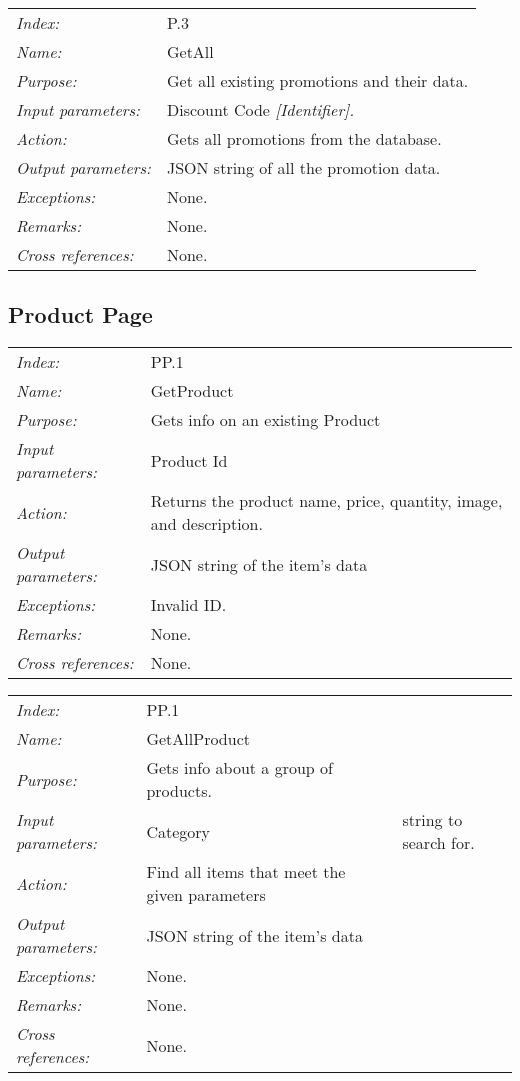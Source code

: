 \documentclass[10pt,letter]{article}
\begin{document}
\begin{tabularx}{\textwidth}{l X}
    \it{Index:} & P.3 \\
    \it{Name:} & GetAll \\
    \it{Purpose:} & Get all existing promotions and their data. \\
    \it{Input parameters:} & Discount Code \it{[Identifier]}.\\
    \it{Action:} & Gets all promotions from the database. \\
    \it{Output parameters:} & JSON string of all the promotion data. \\
    \it{Exceptions:} & None. \\
    \it{Remarks:} & None. \\
    \it{Cross references:} & None. \\
    \hline
\end{tabularx}

\subsection{Product Page}

\begin{tabularx}{\textwidth}{l X}
    \it{Index:} & PP.1 \\
    \it{Name:} & GetProduct \\
    \it{Purpose:} & Gets info on an existing Product\\
    \it{Input parameters:} & Product Id\\
    \it{Action:} & Returns the product name, price, quantity, image, and description.\\
    \it{Output parameters:} & JSON string of the item's data \\
    \it{Exceptions:} & Invalid ID. \\
    \it{Remarks:} & None. \\
    \it{Cross references:} & None. \\
    \hline
\end{tabularx}

\begin{tabularx}{\textwidth}{l X}
    \it{Index:} & PP.1 \\
    \it{Name:} & GetAllProduct \\
    \it{Purpose:} & Gets info about a group of products. \\
    \it{Input parameters:} & Category & string to search for. \\
    \it{Action:} & Find all items that meet the given parameters\\
    \it{Output parameters:} & JSON string of the item's data \\
    \it{Exceptions:} & None. \\
    \it{Remarks:} & None. \\
    \it{Cross references:} & None. \\
    \hline
\end{tabularx}
\end{document}
